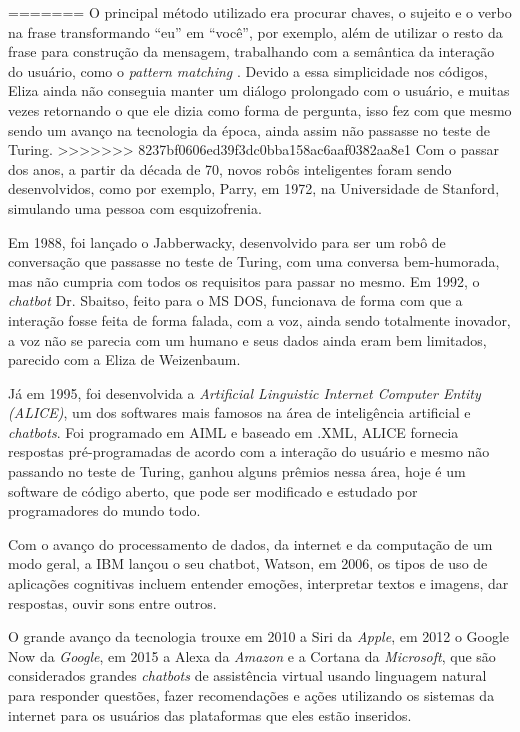 \documentclass[
	12pt,				%
	oneside,
	a4paper,			%
	english,			%
	french,				%
	spanish,			%
	brazil				%
	]{abntex2}
\begin{document}
=======
O principal método utilizado era procurar chaves, o sujeito e o verbo na frase transformando “eu” em “você”, por exemplo, além de utilizar o resto da frase para construção da mensagem, trabalhando com a semântica da interação do usuário, como o \emph{pattern matching} \cite{weizenbaum-eliza}. Devido a essa simplicidade nos códigos, Eliza ainda não conseguia manter um diálogo prolongado com o usuário, e muitas vezes retornando o que ele dizia como forma de pergunta, isso fez com que mesmo sendo um avanço na tecnologia da época, ainda assim não passasse no teste de Turing.
>>>>>>> 8237bf0606ed39f3dc0bba158ac6aaf0382aa8e1
Com o passar dos anos, a partir da década de 70, novos robôs inteligentes foram sendo desenvolvidos, como por exemplo, Parry, em 1972, na Universidade de Stanford, simulando uma pessoa com esquizofrenia. 

Em 1988, foi lançado o Jabberwacky, desenvolvido para ser um robô de conversação que passasse no teste de Turing, com uma conversa bem-humorada, mas não cumpria com todos os requisitos para passar no mesmo. 
Em 1992, o \emph{chatbot} Dr. Sbaitso, feito para o MS DOS, funcionava de forma com que a interação fosse feita de forma falada, com a voz, ainda sendo totalmente inovador, a voz não se parecia com um humano e seus dados ainda eram bem limitados, parecido com a Eliza de Weizenbaum.

Já em 1995, foi desenvolvida a \emph{Artificial Linguistic Internet Computer Entity (ALICE)}, um dos softwares mais famosos na área de inteligência artificial e \emph{chatbots}. Foi programado em AIML e baseado em .XML, ALICE fornecia respostas pré-programadas de acordo com a interação do usuário e mesmo não passando no teste de Turing, ganhou alguns prêmios nessa área, hoje é um software de código aberto, que pode ser modificado e estudado por programadores do mundo todo.

Com o avanço do processamento de dados, da internet e da computação de um modo geral, a IBM lançou o seu chatbot, Watson, em 2006, os tipos de uso de aplicações cognitivas incluem entender emoções, interpretar textos e imagens, dar respostas, ouvir sons entre outros.\cite{ibm-watson}

O grande avanço da tecnologia trouxe em 2010 a Siri da \emph{Apple}, em 2012 o Google Now da \emph{Google}, em 2015 a Alexa da \emph{Amazon} e a Cortana da \emph{Microsoft}, que são considerados grandes \emph{chatbots} de assistência virtual usando linguagem natural para responder questões, fazer recomendações e ações utilizando os sistemas da internet para os usuários das plataformas que eles estão inseridos.
\end{document}
